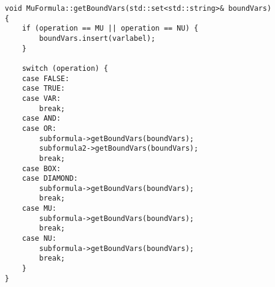 \documentclass[10pt,a4paper]{article}
\begin{document}
\begin{lstlisting}[caption=MuCalculus.cpp]
void MuFormula::getBoundVars(std::set<std::string>& boundVars) 
{
    if (operation == MU || operation == NU) {
        boundVars.insert(varlabel);
    }

    switch (operation) {
    case FALSE:
    case TRUE:
    case VAR:
        break;
    case AND:
    case OR:
        subformula->getBoundVars(boundVars);
        subformula2->getBoundVars(boundVars);
        break;
    case BOX:
    case DIAMOND:
        subformula->getBoundVars(boundVars);
        break;
    case MU:
        subformula->getBoundVars(boundVars);
        break;
    case NU:
        subformula->getBoundVars(boundVars);
        break;
    }
}
\end{lstlisting}
\end{document}
